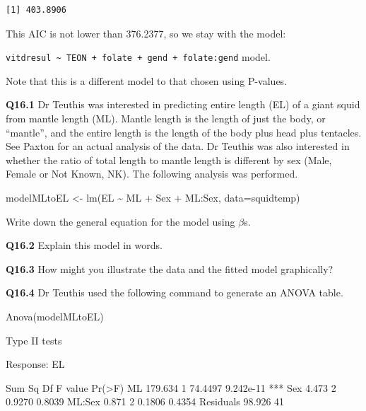 \documentclass[
  oneside]{krantz}
\newenvironment{Shaded}{\begin{snugshade}}{\end{snugshade}}
\newcommand{\AttributeTok}[1]{\textcolor[rgb]{0.77,0.63,0.00}{#1}}
\newcommand{\FunctionTok}[1]{\textcolor[rgb]{0.00,0.00,0.00}{#1}}
\newcommand{\NormalTok}[1]{#1}
\newcommand{\OtherTok}[1]{\textcolor[rgb]{0.56,0.35,0.01}{#1}}
\newcommand{\SpecialCharTok}[1]{\textcolor[rgb]{0.00,0.00,0.00}{#1}}
\newcommand{\StringTok}[1]{\textcolor[rgb]{0.31,0.60,0.02}{#1}}
\begin{document}
\begin{verbatim}
[1] 403.8906
\end{verbatim}

This AIC is not lower than 376.2377, so we stay with the model:

\texttt{vitdresul\ \textasciitilde{}\ TEON\ +\ folate\ +\ gend\ +\ folate:gend} model.

Note that this is a different model to that chosen using P-values.

\textbf{Q16.1} Dr Teuthis was interested in predicting entire length (EL) of a giant squid from mantle length (ML). Mantle length is the length of just the body, or ``mantle'', and the entire length is the length of the body plus head plus tentacles. See Paxton\citeyearpar{Paxton2016} for an actual analysis of the data. Dr Teuthis was also interested in whether the ratio of total length to mantle length is different by sex (Male, Female or Not Known, NK). The following analysis was performed.

\begin{Shaded}
\begin{Highlighting}[]
\NormalTok{modelMLtoEL }\OtherTok{\textless{}{-}} \FunctionTok{lm}\NormalTok{(EL }\SpecialCharTok{\textasciitilde{}}\NormalTok{ ML }\SpecialCharTok{+}\NormalTok{ Sex }\SpecialCharTok{+}\NormalTok{ ML}\SpecialCharTok{:}\NormalTok{Sex, }\AttributeTok{data=}\NormalTok{squidtemp)}
\end{Highlighting}
\end{Shaded}

Write down the general equation for the model using \(\beta\)s.

\textbf{Q16.2} Explain this model in words.

\textbf{Q16.3} How might you illustrate the data and the fitted model graphically?

\textbf{Q16.4} Dr Teuthis used the following command to generate an ANOVA table.

\begin{Shaded}
\begin{Highlighting}[]
\FunctionTok{Anova}\NormalTok{(modelMLtoEL)}

\NormalTok{Type II tests}

\NormalTok{Response}\SpecialCharTok{:}\NormalTok{ EL}\StringTok{\textasciigrave{}}

\AttributeTok{            Sum Sq   Df   F value    Pr(\textgreater{}F)       }
\AttributeTok{  ML        179.634  1    74.4497   9.242e{-}11 ***   }
\AttributeTok{  Sex         4.473  2     0.9270   0.8039          }
\AttributeTok{  ML:Sex      0.871  2     0.1806   0.4354          }
\AttributeTok{  Residuals  98.926 41                              }
\end{Highlighting}
\end{Shaded}
\end{document}
